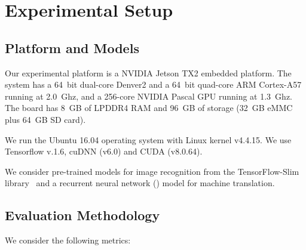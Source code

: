 \section{Experimental Setup \label{sec:setup}}
\subsection{Platform and Models\label{sec:platform}}
 Our experimental platform is a NVIDIA Jetson TX2 embedded platform. The system has a 64~bit dual-core Denver2 and a
64~bit quad-core ARM Cortex-A57 running at 2.0~Ghz, and a 256-core NVIDIA Pascal GPU running at 1.3~Ghz. The board has 8~GB of LPDDR4 RAM
and 96~GB of storage (32~GB eMMC plus 64~GB SD card).


 We run the Ubuntu 16.04 operating system with Linux kernel v4.4.15. We use Tensorflow v.1.6, cuDNN (v6.0) and
CUDA (v8.0.64).


 We consider  pre-trained \CNN models for image recognition from the TensorFlow-Slim
library~\cite{silberman2013tensorflow} and a recurrent neural network (\RNN) model for machine translation. 



\subsection{Evaluation Methodology \label{sec:method}}


 We consider the following metrics:

